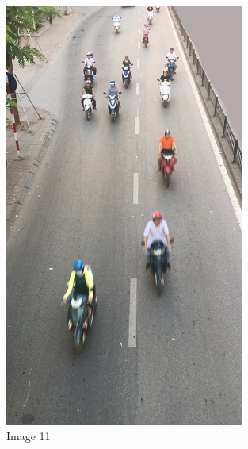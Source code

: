 \begin{center}
    \begin{figure}[H]
        \centering
      \includegraphics[width=0.7\textwidth]{Chapters/Fig/11}
      \caption{Image 11}
      \label{fig:img11}
  \end{figure}
\end{center}

